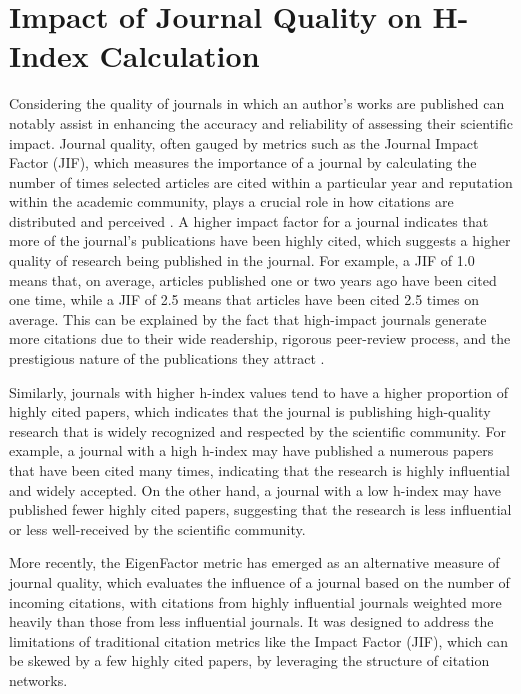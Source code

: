 \section{Impact of Journal Quality on H-Index Calculation}
Considering the quality of journals in which an author's works are published
can notably assist in enhancing the accuracy and reliability of assessing their
scientific impact. Journal quality, often gauged by metrics such as the Journal
Impact Factor (JIF), which measures the importance of a journal by calculating
the number of times selected articles are cited within a particular year and
reputation within the academic community, plays a crucial role in how citations
are distributed and perceived \cite{garfield1999journal, garfield2006history}.
A higher impact factor for a journal indicates that more of the journal's
publications have been highly cited, which suggests a higher quality of
research being published in the journal. For example, a JIF of 1.0 means that,
on average, articles published one or two years ago have been cited one time,
while a JIF of 2.5 means that articles have been cited 2.5 times on average.
This can be explained by the fact that high-impact journals generate more
citations due to their wide readership, rigorous peer-review process, and the
prestigious nature of the publications they attract \cite{garfield2006history}.

Similarly, journals with higher h-index values tend to have a higher proportion
of highly cited papers, which indicates that the journal is publishing
high-quality research that is widely recognized and respected by the scientific
community. For example, a journal with a high h-index may have published a
numerous papers that have been cited many times, indicating that the research
is highly influential and widely accepted. On the other hand, a journal with a
low h-index may have published fewer highly cited papers, suggesting that the
research is less influential or less well-received by the scientific community.

More recently, the EigenFactor metric has emerged as an alternative measure of
journal quality, which evaluates the influence of a journal based on the number
of incoming citations, with citations from highly influential journals weighted
more heavily than those from less influential journals. It was designed to
address the limitations of traditional citation metrics like the Impact Factor
(JIF), which can be skewed by a few highly cited papers, by leveraging the
structure of citation networks.


